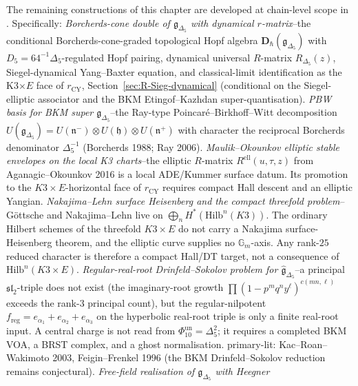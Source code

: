 \begin{remark}
\label{rem:k3yang-downstream-pointers}
The remaining constructions of this chapter are developed at
chain-level scope in
\cite{VolI}.
Specifically:
\emph{Borcherds-cone double of $\mathfrak g_{\Delta_5}$ with dynamical
$r$-matrix}--the conditional Borcherds-cone-graded topological Hopf algebra
$\mathbf D_\hbar(\mathfrak g_{\Delta_5})$ with $D_5=64^{-1}\Delta_5$-regulated
Hopf pairing, dynamical universal $R$-matrix $R_{\Delta_5}(z)$,
Siegel-dynamical Yang--Baxter equation, and classical-limit
identification as the K3$\times E$ face of $r_{\mathrm{CY}}$,
Section~\ref{sec:R-Sieg-dynamical} (conditional on the Siegel-elliptic
associator and the BKM Etingof--Kazhdan super-quantisation).
\emph{PBW basis for BKM super $\mathfrak g_{\Delta_5}$}--the
Ray-type Poincar\'e--Birkhoff--Witt decomposition
$U(\mathfrak g_{\Delta_5}) = U(\mathfrak n^-)\otimes U(\mathfrak h)\otimes
U(\mathfrak n^+)$ with character the reciprocal Borcherds denominator
$\Delta_5^{-1}$ (Borcherds 1988; Ray 2006).
\emph{Maulik--Okounkov elliptic stable envelopes on the local K3
charts}--the elliptic \(R\)-matrix \(R^{\mathrm{ell}}(u,\tau,z)\) from
Aganagic--Okounkov 2016 is a local ADE/Kummer surface datum. Its
promotion to the \(K3\times E\)-horizontal face of \(r_{\mathrm{CY}}\)
requires compact Hall descent and an elliptic Yangian.
\emph{Nakajima--Lehn surface Heisenberg and the compact threefold
problem}--G\"ottsche and Nakajima--Lehn live on
\(\bigoplus_nH^\ast(\mathrm{Hilb}^n(K3))\). The ordinary Hilbert
schemes of the threefold \(K3\times E\) do not carry a Nakajima
surface-Heisenberg theorem, and the elliptic curve supplies no
\(\mathbb G_m\)-axis. Any rank-\(25\) reduced character is therefore a
compact Hall/DT target, not a consequence of \(\mathrm{Hilb}^n(K3\times E)\).
\emph{Regular-real-root Drinfeld--Sokolov problem for
\(\hat{\mathfrak g}_{\Delta_5}\)}--a
principal $\mathfrak{sl}_2$-triple does not exist (the imaginary-root
growth $\prod(1-p^mq^ny^\ell)^{c(mn,\ell)}$ exceeds the rank-$3$
principal count), but the regular-nilpotent
$f_{\mathrm{reg}} = e_{\alpha_1}+e_{\alpha_2}+e_{\alpha_3}$ on the
hyperbolic real-root triple is only a finite real-root input. A
central charge is not read from \(\Phi_{10}^{\mathrm{un}}=\Delta_5^2\);
it requires a completed BKM VOA, a BRST complex, and a ghost
normalisation.
primary-lit: Kac--Roan--Wakimoto 2003,
Feigin--Frenkel 1996
(the BKM Drinfeld--Sokolov reduction remains conjectural).
\emph{Free-field realisation of $\mathfrak g_{\Delta_5}$ with Heegner
}
\end{remark}
